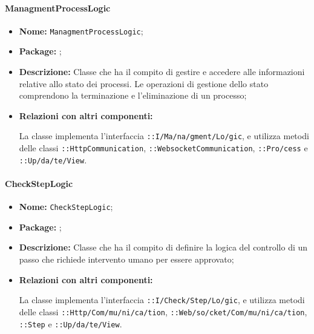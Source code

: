 \paragraph{ManagmentProcessLogic}
\begin{flushleft}
\begin{itemize}
\item \textbf{Nome:} \texttt{ManagmentProcessLogic};
\item \textbf{Package:} \texttt{\logicAdmin{}};
\item \textbf{Descrizione:} Classe che ha il compito di gestire e accedere alle informazioni relative allo stato dei processi. Le operazioni di gestione dello stato comprendono la terminazione e l'eliminazione di un processo;
\item \textbf{Relazioni con altri componenti:}
\begin{sloppypar}
La classe implementa l'interfaccia \texttt{\iLogicAdmin{}::I\fshyp{}Ma\fshyp{}na\fshyp{}gment\fshyp{}Lo\fshyp{}gic}, e utilizza metodi delle classi \texttt{\serverCommunication{}::HttpCommunication}, \texttt{\serverCommunication{}::WebsocketCommunication}, \texttt{\modelAdmin{}::Pro\fshyp{}cess} e \texttt{\logicAdmin{}::Up\fshyp{}da\fshyp{}te\fshyp{}View}.
\end{sloppypar}
\end{itemize}
\end{flushleft}

\paragraph{CheckStepLogic}
\begin{flushleft}
\begin{itemize}
\item \textbf{Nome:} \texttt{CheckStepLogic};
\item \textbf{Package:} \texttt{\logicAdmin{}};
\item \textbf{Descrizione:} Classe che ha il compito di definire la logica del controllo di un passo che richiede intervento umano per essere approvato;
\item \textbf{Relazioni con altri componenti:}
\begin{sloppypar}
La classe implementa l'interfaccia \texttt{\iLogicAdmin{}::I\fshyp{}Check\fshyp{}Step\fshyp{}Lo\fshyp{}gic}, e utilizza metodi delle classi \texttt{\serverCommunication{}::Http\fshyp{}Com\fshyp{}mu\fshyp{}ni\fshyp{}ca\fshyp{}tion}, \texttt{\serverCommunication{}::Web\fshyp{}so\fshyp{}cket\fshyp{}Com\fshyp{}mu\fshyp{}ni\fshyp{}ca\fshyp{}tion}, \texttt{\modelAdmin{}::Step} e \texttt{\logicAdmin{}::Up\fshyp{}da\fshyp{}te\fshyp{}View}.
\end{sloppypar}
\end{itemize}
\end{flushleft}

